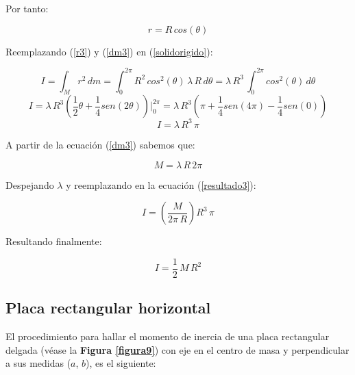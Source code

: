 \documentclass[letter,oneside,11pt]{article}
\begin{document}
Por tanto:

\begin{equation}
    r = R\, cos(\theta)
\label{r3}
\end{equation}

Reemplazando (\ref{r3}) y (\ref{dm3}) en (\ref{solidorigido}):

\begin{equation*}
    I = \int_{M} r^2\, dm = \int_{0}^{2\pi} R^2\, cos^2(\theta)\, \lambda\, R\, d\theta = \lambda\, R^3\, \int_{0}^{2\pi} cos^2(\theta)\, d\theta
\end{equation*}
\begin{equation*}
    I = \lambda\, R^3 \left( \frac{1}{2} \theta + \frac{1}{4} sen (2\theta) \right) \Biggr|_{0}^{2\pi} = \lambda\, R^3 \left( \pi + \frac{1}{4} sen(4\pi) - \frac{1}{4} sen(0) \right)
\end{equation*}
\begin{equation}
    I = \lambda\, R^3\, \pi
\label{resultado3}
\end{equation}

A partir de la ecuación (\ref{dm3}) sabemos que:

\begin{equation*}
    M = \lambda\, R\, 2\pi
\end{equation*}

Despejando $\lambda$ y reemplazando en la ecuación (\ref{resultado3}):

\begin{equation*}
    I = \left( \frac{M}{2\pi\, R} \right) R^3\, \pi
\end{equation*}

Resultando finalmente:

\begin{equation}
    I = \frac{1}{2}\, M\, R^2
\end{equation}

\subsection{Placa rectangular horizontal}
El procedimiento para hallar el momento de inercia de una placa rectangular
delgada (véase la \textbf{Figura \ref{figura9}}) con eje en el centro de masa y
perpendicular a sus medidas ($a$, $b$), es el siguiente:
\end{document}
